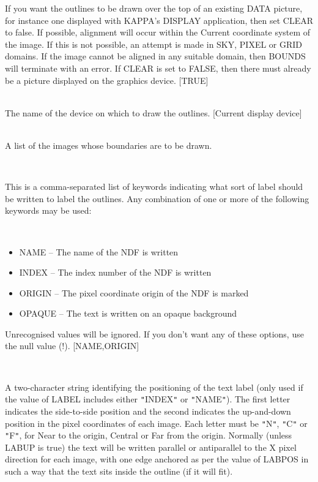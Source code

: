 \documentclass[twoside,11pt]{article}
\newcommand{\xref}[3]{#1}
\renewcommand{\_}{\texttt{\symbol{95}}}
\newcommand{\routine}[1]{{\sc #1}}
\newcommand{\sstsubsection}[1]{ \item[{#1}] \mbox{} \\}
\newcommand{\sstitemlist}[1]{
  \mbox{} \\
  \vspace{-3.5ex}
  \begin{itemize}
     #1
  \end{itemize}
}
\newcommand{\sstitem}{\item}
\newcommand{\sstsubsection}[1]{\item[{#1}]}
\newcommand{\sstitemlist}[1]{
      \begin{itemize}
         #1
      \end{itemize}
      \\
   }
\newcommand{\sstitem}{\item}
\begin{document}
{{{         If you want the outlines to be drawn over the top
         of an existing DATA picture, for instance one displayed with
         KAPPA's \xref{DISPLAY}{sun95}{DISPLAY} application, then set CLEAR to false.  If
         possible, alignment will occur within the Current coordinate
         system of the image.  If this is not possible, an attempt is
         made in SKY, PIXEL or GRID domains.  If the image cannot be
         aligned in any suitable domain, then \routine{BOUNDS} will terminate
         with an error.  If CLEAR is set to FALSE, then there must
         already be a picture displayed on the graphics device.
         [TRUE]
      }
      \sstsubsection{
         DEVICE = DEVICE (Read)
      }{
         The name of the device on which to draw the outlines.
         [Current display device]
      }
      \sstsubsection{
         IN = LITERAL (Read)
      }{
         A list of the images whose boundaries are to be drawn.
      }
      \sstsubsection{
         LABMODE = LITERAL( $*$ ) (Read)
      }{
         This is a comma-separated list of keywords indicating what
         sort of label should be written to label the outlines.
         Any combination of one or more of the following keywords may
         be used:
         \sstitemlist{

            \sstitem
               NAME   -- The name of the NDF is written

            \sstitem
               INDEX  -- The index number of the NDF is written

            \sstitem
               ORIGIN -- The pixel coordinate origin of the NDF is marked

            \sstitem
               OPAQUE -- The text is written on an opaque background

         }
         Unrecognised values will be ignored.  If you don't want any
         of these options, use the null value (!).
         [NAME,ORIGIN]
      }
      \sstsubsection{
         LABPOS = LITERAL (Read)
      }{
         A two-character string identifying the positioning of the text
         label (only used if the value of LABEL includes either {\tt "}INDEX{\tt "}
         or {\tt "}NAME{\tt "}).  The first letter indicates the side-to-side
         position and the second indicates the up-and-down position
         in the pixel coordinates of each image.  Each letter must be
         {\tt "}N{\tt "}, {\tt "}C{\tt "} or {\tt "}F{\tt "}, for Near to the origin, Central or Far from
         the origin.  Normally (unless LABUP is true) the text
         will be written parallel or antiparallel to the X pixel
         direction for each image, with one edge anchored as per the
         value of LABPOS in such a way that the text sits inside the
         outline (if it will fit).

}}}
\end{document}
